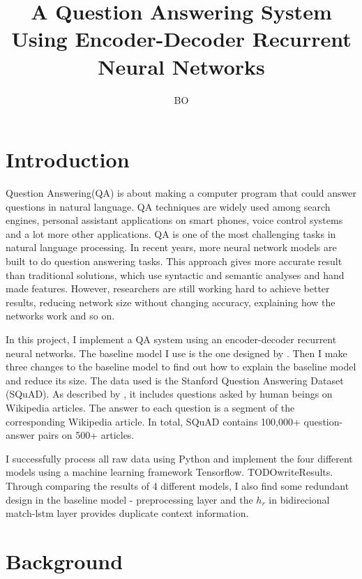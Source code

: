 \documentclass[modernstyle,12pt]{sjsuthesis}
\title{A Question Answering System Using Encoder-Decoder Recurrent Neural Networks}
\author{BO}{LI}
\theoremstyle{definition}
\begin{document}
\raggedright          %
\parindent=30pt       %




\chapter{Introduction}

Question Answering(QA) is about making a computer program that could answer questions in natural language. QA techniques are widely used among search engines, personal assistant applications on smart phones, voice control systems and a lot more other applications. QA is one of the most challenging tasks in natural language processing. In recent years, more neural network models are built to do question answering tasks. This approach gives more accurate result than traditional solutions, which use syntactic and semantic analyses and hand made features. However, researchers are still working hard to achieve better results, reducing network size without changing accuracy, explaining how the networks work and so on.

In this project, I implement a QA system using an encoder-decoder recurrent neural networks. The baseline model I use is the one designed by \cite{wang2016machine}. Then I make three changes to the baseline model to find out how to explain the baseline model and reduce its size. The data used is the Stanford Question Answering Dataset (SQuAD). As described by \cite{rajpurkar2016squad}, it includes questions asked by human beings on Wikipedia articles. The answer to each question is a segment of the corresponding Wikipedia article. In total, SQuAD contains 100,000+ question-answer pairs on 500+ articles.


I successfully process all raw data using Python and implement the four different models using a machine learning framework Tensorflow. TODOwriteResults. Through comparing the results of 4 different models, I also find some redundant design in the baseline model - preprocessing layer and the $h_r$ in bidirecional match-lstm layer provides duplicate context information.



\chapter{Background}
\end{document}
